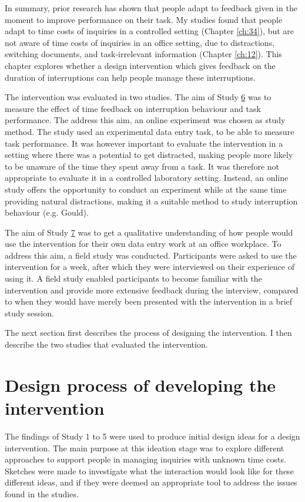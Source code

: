 In summary, prior research has shown that people adapt to feedback given in the moment to improve performance on their task. My studies found that people adapt to time costs of inquiries in a controlled setting (Chapter \ref{ch:34}), but are not aware of time costs of inquiries in an office setting, due to distractions, switching documents, and task-irrelevant information (Chapter \ref{ch:12}). This chapter explores whether a design intervention which gives feedback on the duration of interruptions can help people manage these interruptions.

The intervention was evaluated in two studies. The aim of Study \hyperref[st:Study6]{6} was to measure the effect of time feedback on interruption behaviour and task performance. The address this aim, an online experiment was chosen as study method. The study used an experimental data entry task, to be able to measure task performance. It was however important to evaluate the intervention in a setting where there was a potential to get distracted, making people more likely to be unaware of the time they spent away from a task. It was therefore not appropriate to evaluate it in a controlled laboratory setting. Instead, an online study offers the opportunity to conduct an experiment while at the same time providing natural distractions, making it a suitable method to study interruption behaviour (e.g. Gould).

The aim of Study \hyperref[st:Study7]{7}  was to get a qualitative understanding of how people would use the intervention for their own data entry work at an office workplace. To address this aim, a field study was conducted. Participants were asked to use the intervention for a week, after which they were interviewed on their experience of using it. 
A field study enabled participants to become familiar with the intervention and provide more extensive feedback during the interview, compared to when they would have merely been presented with the intervention in a brief study session. 

The next section first describes the process of designing the intervention. I then describe the two studies that evaluated the intervention. 


\section{Design process of developing the intervention}
The findings of Study 1 to 5 were used to produce initial design ideas for a design intervention. The main purpose at this ideation stage was to explore different approaches to support people in managing inquiries with unknown time costs. Sketches were made to investigate what the interaction would look like for these different ideas, and if they were deemed an appropriate tool to address the issues found in the studies. 

